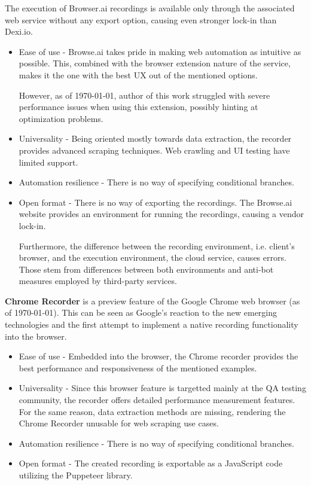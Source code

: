 The execution of Browser.ai recordings is available only through the associated web service without any export option, causing even stronger lock-in than Dexi.io.

\begin{itemize}
    \item Ease of use - Browse.ai takes pride in making web automation as intuitive as possible. 
    This, combined with the browser extension nature of the service, makes it the one with the best \ac{UX} out of the mentioned options.
    
    However, as of \today, author of this work struggled with severe performance issues when using this extension, possibly hinting at optimization problems.

    \item Universality - Being oriented mostly towards data extraction, the recorder provides advanced scraping techniques.
    Web crawling and \ac{UI} testing have limited support.

    \item Automation resilience -
    There is no way of specifying conditional branches. 
    
    \item Open format - There is no way of exporting the recordings. 
    The Browse.ai website provides an environment for running the recordings, causing a vendor lock-in. 
    
    Furthermore, the difference between the recording environment, i.e. client's browser, and the execution environment, the cloud service, causes errors. 
    Those stem from differences between both environments and anti-bot measures employed by third-party services.
\end{itemize}

\textbf{Chrome Recorder} is a preview feature of the Google Chrome web browser (as of \today).
This can be seen as Google's reaction to the new emerging technologies and the first attempt to implement a native recording functionality into the browser.

\begin{itemize}
    \item Ease of use - Embedded into the browser, the Chrome recorder provides the best performance and responsiveness of the mentioned examples.  

    \item Universality - Since this browser feature is targetted mainly at the \ac{QA} testing community, the recorder offers detailed performance measurement features.
    For the same reason, data extraction methods are missing, rendering the Chrome Recorder unusable for web scraping use cases.    

    \item Automation resilience -
    There is no way of specifying conditional branches. 
    
    \item Open format - The created recording is exportable as a JavaScript code utilizing the Puppeteer library.
\end{itemize}

